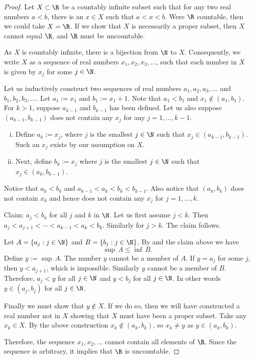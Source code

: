 \documentclass[12pt]{book}
\begin{document}
\begin{proof}
Let $X \subset \R$ be a countably infinite
subset such that for any two real numbers
$a < b$, there is an $x \in X$ such that $a < x < b$.
Were $\R$ countable,
then we could take $X = \R$.
If we show that $X$ is necessarily
a proper subset, then $X$ cannot equal $\R$, and $\R$ must be
uncountable.

As $X$ is countably infinite, 
there is a bijection from $\N$ to $X$.
Consequently, we write $X$ as
a sequence of real numbers $x_1, x_2, x_3,\ldots$, such that
each number in $X$
is given by $x_j$ for some $j \in \N$.

Let us inductively
construct two sequences of real numbers $a_1,a_2,a_3,\ldots$ and
$b_1,b_2,b_3,\ldots$.
Let
$a_1 := x_1$ and $b_1 := x_1+1$.
Note that $a_1 < b_1$ and
$x_1 \notin (a_1,b_1)$.
For $k > 1$, suppose $a_{k-1}$ and $b_{k-1}$ has been defined.
Let us also suppose $(a_{k-1},b_{k-1})$ does not contain any $x_j$
for any $j=1,\ldots,k-1$.
\begin{enumerate}[(i)]
\item Define $a_k := x_j$, where $j$ is the smallest $j \in \N$
such that $x_j \in (a_{k-1},b_{k-1})$.
Such an $x_j$ exists by our
assumption on $X$.  
\item Next, define $b_k := x_j$ where $j$ is the smallest $j \in \N$
such that $x_j \in (a_{k},b_{k-1})$.
\end{enumerate}
Notice that $a_k < b_k$ and $a_{k-1} < a_k < b_k < b_{k-1}$.
Also notice that $(a_{k},b_{k})$ does not contain $x_k$ and hence
does not contain any $x_j$ for $j=1,\ldots,k$.

Claim: $a_j < b_k$ for all $j$ and $k$ in $\N$.
Let us first
assume $j < k$.
Then $a_j < a_{j+1} < \cdots < a_{k-1} < a_k < b_k$.
Similarly for $j > k$.
The claim follows.

Let $A = \{ a_j : j \in \N \}$ and $B = \{ b_j : j \in \N \}$.
By  and the claim above we have
\begin{equation*}
\sup\, A \leq \inf\, B .
\end{equation*}
Define $y := \sup\, A$.
The number $y$ cannot be a member of $A$.
If $y = a_j$
for some $j$, then $y < a_{j+1}$, which is impossible.
Similarly $y$ cannot be a member of $B$.
Therefore,
$a_j < y$ for all $j\in \N$
and $y < b_j$ for all $j\in \N$.
In other words $y \in (a_j,b_j)$ for all $j\in \N$.

Finally we must show that $y \notin X$.
If we do so, then we will have
constructed a real number not in $X$ showing that $X$ must have been a
proper subset.
Take any $x_k \in X$.
By the above construction
$x_k \notin (a_k,b_k)$, so $x_k \not= y$ as $y \in (a_k,b_k)$.

Therefore, the sequence $x_1,x_2,\ldots$ cannot contain all elements of $\R$.
Since the sequence is arbitrary, it implies that $\R$ is uncountable.
\end{proof}
\end{document}
